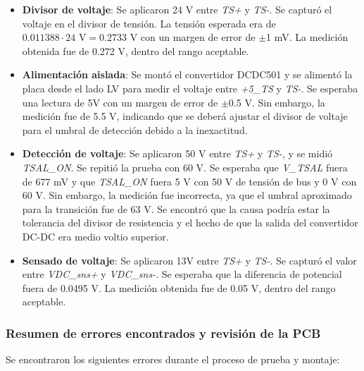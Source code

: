 \begin{itemize}
	\item \textbf{Divisor de voltaje}: Se aplicaron 24 V entre \textit{TS+} y \textit{TS-}. Se capturó el voltaje en el divisor de tensión. La tensión esperada era de $0.011388 \cdot 24\text{ V} = 0.2733 \text{ V}$ con un margen de error de $\pm$1 mV. La medición obtenida fue de 0.272 V, dentro del rango aceptable.
	
	\item \textbf{Alimentación aislada}: Se montó el convertidor DCDC501 y se alimentó la placa desde el lado LV para medir el voltaje entre \textit{+5\_TS} y \textit{TS-}. Se esperaba una lectura de 5V con un margen de error de $\pm$0.5 V. Sin embargo, la medición fue de 5.5 V, indicando que se deberá ajustar el divisor de voltaje para el umbral de detección debido a la inexactitud.
	
	\item \textbf{Detección de voltaje}: Se aplicaron 50 V entre \textit{TS+} y \textit{TS-}, y se midió \textit{TSAL\_ON}. Se repitió la prueba con 60 V. Se esperaba que \textit{V\_TSAL} fuera de 677 mV y que \textit{TSAL\_ON} fuera 5 V con 50 V de tensión de bus y 0 V con 60 V. Sin embargo, la medición fue incorrecta, ya que el umbral aproximado para la transición fue de 63 V. Se encontró que la causa podría estar la tolerancia del divisor de resistencia y el hecho de que la salida del convertidor DC-DC era medio voltio superior.

	\item \textbf{Sensado de voltaje}: Se aplicaron 13V entre \textit{TS+} y \textit{TS-}. Se capturó el valor entre \textit{VDC\_sns+} y \textit{VDC\_sns-}. Se esperaba que la diferencia de potencial fuera de 0.0495 V. La medición obtenida fue de 0.05 V, dentro del rango aceptable.
\end{itemize}


\subsubsection{Resumen de errores encontrados y revisión de la PCB}

Se encontraron los siguientes errores durante el proceso de prueba y montaje:

